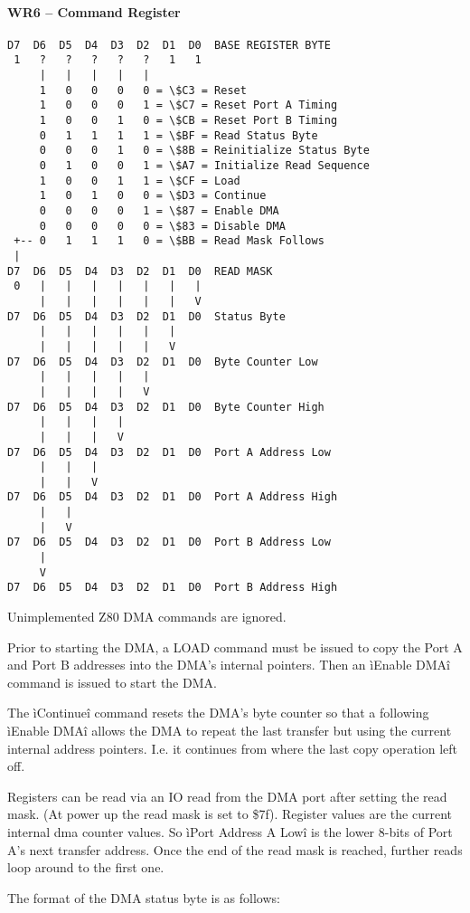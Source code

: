 \begin{multicols}{2}
\paragraph{WR6 – Command Register}
\begin{verbatim}
D7  D6  D5  D4  D3  D2  D1  D0  BASE REGISTER BYTE
 1   ?   ?   ?   ?   ?   1   1
     |   |   |   |   |
     1   0   0   0   0 = \$C3 = Reset
     1   0   0   0   1 = \$C7 = Reset Port A Timing
     1   0   0   1   0 = \$CB = Reset Port B Timing
     0   1   1   1   1 = \$BF = Read Status Byte
     0   0   0   1   0 = \$8B = Reinitialize Status Byte
     0   1   0   0   1 = \$A7 = Initialize Read Sequence
     1   0   0   1   1 = \$CF = Load
     1   0   1   0   0 = \$D3 = Continue
     0   0   0   0   1 = \$87 = Enable DMA
     0   0   0   0   0 = \$83 = Disable DMA
 +-- 0   1   1   1   0 = \$BB = Read Mask Follows
 |
D7  D6  D5  D4  D3  D2  D1  D0  READ MASK
 0   |   |   |   |   |   |   |
     |   |   |   |   |   |   V
D7  D6  D5  D4  D3  D2  D1  D0  Status Byte
     |   |   |   |   |   |
     |   |   |   |   |   V
D7  D6  D5  D4  D3  D2  D1  D0  Byte Counter Low
     |   |   |   |   |
     |   |   |   |   V
D7  D6  D5  D4  D3  D2  D1  D0  Byte Counter High
     |   |   |   |
     |   |   |   V
D7  D6  D5  D4  D3  D2  D1  D0  Port A Address Low
     |   |   |
     |   |   V
D7  D6  D5  D4  D3  D2  D1  D0  Port A Address High
     |   |
     |   V
D7  D6  D5  D4  D3  D2  D1  D0  Port B Address Low
     |
     V
D7  D6  D5  D4  D3  D2  D1  D0  Port B Address High
\end{verbatim}
Unimplemented Z80 DMA commands are ignored.

Prior to starting the DMA, a LOAD command must be issued to copy the
Port A and Port B addresses into the DMA's internal pointers. Then an
ìEnable DMAî command is issued to start the DMA.

The ìContinueî command resets the DMA’s byte counter so that a
following ìEnable DMAî allows the DMA to repeat the last transfer but
using the current internal address pointers. I.e. it continues from
where the last copy operation left off.

Registers can be read via an IO read from the DMA port after setting
the read mask. (At power up the read mask is set to \$7f). Register
values are the current internal dma counter values. So ìPort Address A
Lowî is the lower 8-bits of Port A’s next transfer address. Once the
end of the read mask is reached, further reads loop around to the
first one.

The format of the DMA status byte is as follows:


\end{multicols}
